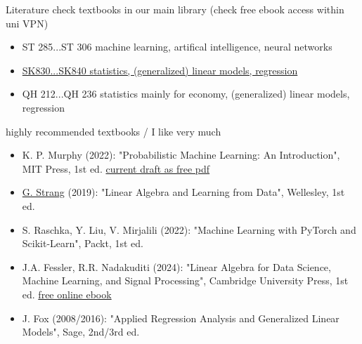 \documentclass[mathserif, aspectratio=1610]{intbeamer}
\begin{document}
%
%
%
\begin{frame}{Literature}
  check textbooks in our main library (check free ebook access within uni VPN)
  \begin{itemize}
    \item ST 285...ST 306 machine learning, artifical intelligence, neural networks
    \item \href{https://find.ub.uni-rostock.de/sk830}{SK830...SK840 statistics, (generalized) linear models, regression}
    \item QH 212...QH 236 statistics mainly for economy, (generalized) linear models, regression
  \end{itemize}
  \vspace{0.5cm}
  highly recommended textbooks / I like very much
  \begin{itemize}
    \item K. P. Murphy (2022): "Probabilistic Machine Learning: An Introduction", MIT Press, 1st ed.
    \href{https://probml.github.io/pml-book/book1.html}{current draft as free pdf}
    \item \href{https://math.mit.edu/~gs/}{G. Strang} (2019): "Linear Algebra and Learning from Data", Wellesley, 1st ed.
    \item S. Raschka, Y. Liu, V. Mirjalili (2022): "Machine Learning with PyTorch and Scikit-Learn", Packt, 1st ed.
    \item J.A. Fessler, R.R. Nadakuditi (2024): "Linear Algebra for Data Science, Machine Learning, and Signal Processing", Cambridge University Press, 1st ed. \href{https://ebookcentral.proquest.com/lib/ubrostock-ebooks/detail.action?docID=31691281}{free online ebook}
    \item J. Fox (2008/2016): "Applied Regression Analysis and Generalized Linear Models", Sage, 2nd/3rd ed.
    \end{itemize}
\end{frame}
\end{document}
